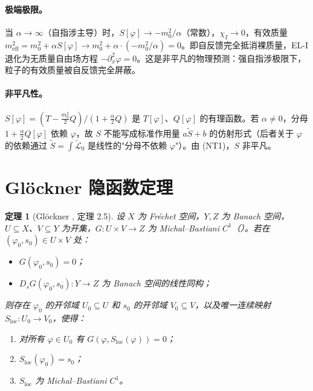 \documentclass[12pt,a4paper]{article}
\newtheorem{theorem}{定理}[section]
\theoremstyle{definition}
\newcommand{\mL}{\mathcal{L}}
\begin{document}
\paragraph{极端极限。}
当 $\alpha \to \infty$（自指涉主导）时，$S[\varphi] \to -m_0^2/\alpha$（常数），$\chi_I \to 0$，有效质量 $m_{\mathrm{eff}}^2 = m_0^2 + \alpha S[\varphi] \to m_0^2 + \alpha \cdot (-m_0^2/\alpha) = 0$。即自反馈完全抵消裸质量，EL-I 退化为无质量自由场方程 $-\partial_x^2 \varphi = 0$。这是非平凡的物理预测：强自指涉极限下，粒子的有效质量被自反馈完全屏蔽。

\paragraph{非平凡性。}
$S[\varphi] = (T - \frac{m_0^2}{2}Q)/(1 + \frac{\alpha}{2}Q)$ 是 $T[\varphi]$、$Q[\varphi]$ 的有理函数。若 $\alpha \neq 0$，分母 $1 + \frac{\alpha}{2}Q[\varphi]$ 依赖 $\varphi$，故 $S$ 不能写成标准作用量 $a\tilde{S} + b$ 的仿射形式（后者关于 $\varphi$ 的依赖通过 $\tilde{S} = \int\tilde{\mL}_0$ 是线性的"分母不依赖 $\varphi$"）。由  (NT1)，$S$ 非平凡。

\section{Gl\"ockner 隐函数定理}
\label{sec:glockner-full}

\begin{theorem}[Gl\"ockner {\cite{Glockner2006}, 定理 2.5}]
\label{thm:glockner-full}
设 $X$ 为 Fr\'echet 空间，$Y, Z$ 为 Banach 空间，$U \subseteq X$、$V \subseteq Y$ 为开集，$G: U \times V \to Z$ 为 Michal--Bastiani $C^1$（）。若在 $(\varphi_0, s_0) \in U \times V$ 处：
\begin{itemize}
\item[(IFT-1)] $G(\varphi_0, s_0) = 0$；
\item[(IFT-2)] $D_s G(\varphi_0, s_0): Y \to Z$ 为 Banach 空间的线性同构；
\end{itemize}
则存在 $\varphi_0$ 的开邻域 $U_0 \subseteq U$ 和 $s_0$ 的开邻域 $V_0 \subseteq V$，以及唯一连续映射 $S_{\mathrm{loc}}: U_0 \to V_0$，使得：
\begin{enumerate}
\item 对所有 $\varphi \in U_0$ 有 $G(\varphi, S_{\mathrm{loc}}(\varphi)) = 0$；
\item $S_{\mathrm{loc}}(\varphi_0) = s_0$；
\item $S_{\mathrm{loc}}$ 为 Michal--Bastiani $C^1$。
\end{enumerate}
\end{theorem}
\end{document}
